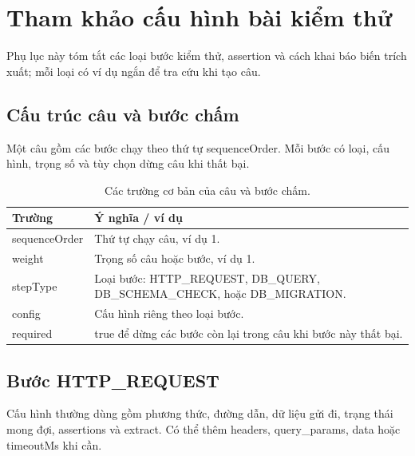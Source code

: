 \documentclass[../BTL.tex]{subfiles}
\begin{document}
\chapter{Tham khảo cấu hình bài kiểm thử}
\label{phu-luc:chapter}

Phụ lục này tóm tắt các loại bước kiểm thử, assertion và cách khai báo biến trích xuất; mỗi loại có ví dụ ngắn để tra cứu khi tạo câu.

\section{Cấu trúc câu và bước chấm}

Một câu gồm các bước chạy theo thứ tự \textnormal{sequenceOrder}. Mỗi bước có loại, cấu hình, trọng số và tùy chọn dừng câu khi thất bại.

\begin{table}[H]
\centering
\begin{tabularx}{\textwidth}{|p{3.1cm}|X|}
\hline
Trường & Ý nghĩa / ví dụ \\ \hline
\textnormal{sequenceOrder} & Thứ tự chạy câu, ví dụ \textnormal{1}. \\ \hline
\textnormal{weight} & Trọng số câu hoặc bước, ví dụ \textnormal{1}. \\ \hline
\textnormal{stepType} & Loại bước: \textnormal{HTTP\_REQUEST}, \textnormal{DB\_QUERY}, \textnormal{DB\_SCHEMA\_CHECK}, hoặc \textnormal{DB\_MIGRATION}. \\ \hline
\textnormal{config} & Cấu hình riêng theo loại bước. \\ \hline
\textnormal{required} & \textnormal{true} để dừng các bước còn lại trong câu khi bước này thất bại. \\ \hline
\end{tabularx}
\caption{Các trường cơ bản của câu và bước chấm.}
\label{tab:plan-step-quick-reference}
\end{table}

\section{Bước HTTP\_REQUEST}

Cấu hình thường dùng gồm phương thức, đường dẫn, dữ liệu gửi đi, trạng thái mong đợi, assertions và extract. Có thể thêm \textnormal{headers}, \textnormal{query\_params}, \textnormal{data} hoặc \textnormal{timeoutMs} khi cần.
\end{document}
